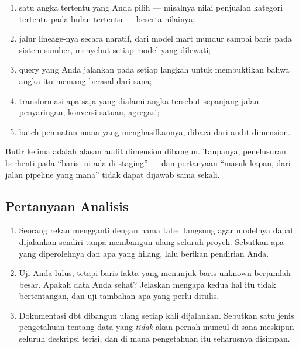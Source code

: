 \begin{enumerate}[leftmargin=1.4em]
  \item satu angka tertentu yang Anda pilih --- misalnya nilai penjualan
        kategori tertentu pada bulan tertentu --- beserta nilainya;
  \item jalur lineage-nya secara naratif, dari model mart mundur sampai baris
        pada sistem sumber, menyebut setiap model yang dilewati;
  \item query yang Anda jalankan pada setiap langkah untuk membuktikan bahwa
        angka itu memang berasal dari sana;
  \item transformasi apa saja yang dialami angka tersebut sepanjang jalan ---
        penyaringan, konversi satuan, agregasi;
  \item batch pemuatan mana yang menghasilkannya, dibaca dari audit dimension.
\end{enumerate}

\begin{catatan}
Butir kelima adalah alasan audit dimension dibangun. Tanpanya, penelusuran
berhenti pada ``baris ini ada di staging'' --- dan pertanyaan ``masuk kapan,
dari jalan pipeline yang mana'' tidak dapat dijawab sama sekali.
\end{catatan}

\subsection{Pertanyaan Analisis}

\begin{enumerate}[leftmargin=1.4em]
  \item Seorang rekan mengganti  dengan nama tabel langsung agar
        modelnya dapat dijalankan sendiri tanpa membangun ulang seluruh
        proyek. Sebutkan apa yang diperolehnya dan apa yang hilang, lalu
        berikan pendirian Anda.
  \item Uji  Anda lulus, tetapi baris fakta yang
        menunjuk baris unknown berjumlah besar. Apakah data Anda sehat?
        Jelaskan mengapa kedua hal itu tidak bertentangan, dan uji tambahan apa
        yang perlu ditulis.
  \item Dokumentasi dbt dibangun ulang setiap kali 
        dijalankan. Sebutkan satu jenis pengetahuan tentang data yang
        \emph{tidak} akan pernah muncul di sana meskipun seluruh deskripsi
        terisi, dan di mana pengetahuan itu seharusnya disimpan.
\end{enumerate}

